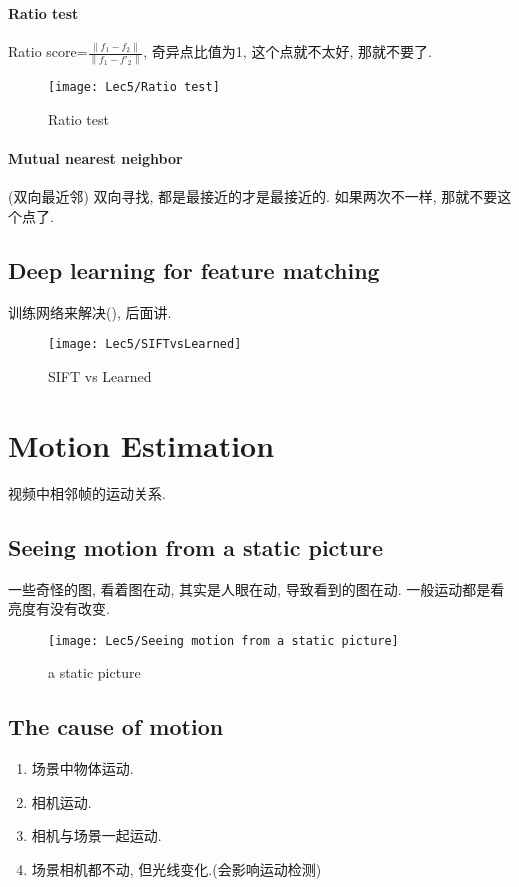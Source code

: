 \paragraph{Ratio test} 
Ratio score=$\frac{\left\| f_1-f_2\right\|}{\left\| f_1-f'_2\right\|}$, 奇异点比值为1, 这个点就不太好, 那就不要了. 
\begin{figure}[H]
    \centering
    \texttt{[image: Lec5/Ratio test]}
    \caption{Ratio test}
\end{figure}

\paragraph{Mutual nearest neighbor}(双向最近邻)
双向寻找, 都是最接近的才是最接近的. 如果两次不一样, 那就不要这个点了. 

\subsection{Deep learning for feature matching}
训练网络来解决(), 后面讲.
\begin{figure}[H]
    \centering
    \texttt{[image: Lec5/SIFTvsLearned]}
    \caption{SIFT vs Learned}
\end{figure}

\section{Motion Estimation}
视频中相邻帧的运动关系. 

\subsection{Seeing motion from a static picture}
一些奇怪的图, 看着图在动, 其实是人眼在动, 导致看到的图在动. 一般运动都是看亮度有没有改变. 
\begin{figure}[H]
    \centering
    \texttt{[image: Lec5/Seeing motion from a static picture]}
    \caption{a static picture}
\end{figure}

\subsection{The cause of motion}
\begin{enumerate}
    \item 场景中物体运动.
    \item 相机运动.
    \item 相机与场景一起运动.
    \item 场景相机都不动, 但光线变化.(会影响运动检测)
\end{enumerate}

